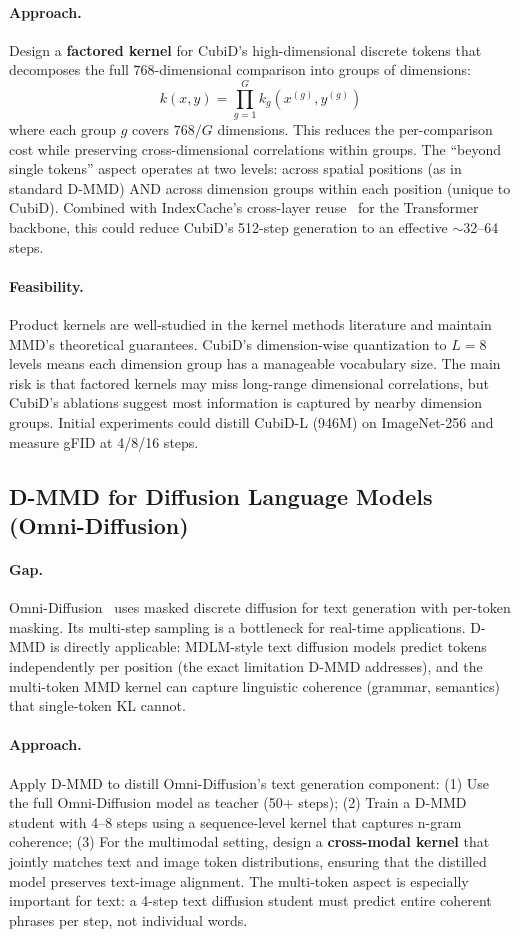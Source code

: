 \documentclass[11pt]{article}
\begin{document}
\paragraph{Approach.}
Design a \textbf{factored kernel} for CubiD's high-dimensional discrete tokens that decomposes the full $768$-dimensional comparison into groups of dimensions:
\[
k(x, y) = \prod_{g=1}^{G} k_g(x^{(g)}, y^{(g)})
\]
where each group $g$ covers $768/G$ dimensions.
This reduces the per-comparison cost while preserving cross-dimensional correlations within groups.
The ``beyond single tokens'' aspect operates at two levels: across spatial positions (as in standard D-MMD) AND across dimension groups within each position (unique to CubiD).
Combined with IndexCache's cross-layer reuse~\cite{indexcache} for the Transformer backbone, this could reduce CubiD's 512-step generation to an effective $\sim$32--64 steps.

\paragraph{Feasibility.}
Product kernels are well-studied in the kernel methods literature and maintain MMD's theoretical guarantees.
CubiD's dimension-wise quantization to $L=8$ levels means each dimension group has a manageable vocabulary size.
The main risk is that factored kernels may miss long-range dimensional correlations, but CubiD's ablations suggest most information is captured by nearby dimension groups.
Initial experiments could distill CubiD-L (946M) on ImageNet-256 and measure gFID at 4/8/16 steps.

\subsection{D-MMD for Diffusion Language Models (Omni-Diffusion)}

\paragraph{Gap.}
Omni-Diffusion~\cite{omnidiff} uses masked discrete diffusion for text generation with per-token masking.
Its multi-step sampling is a bottleneck for real-time applications.
D-MMD is directly applicable: MDLM-style text diffusion models predict tokens independently per position (the exact limitation D-MMD addresses), and the multi-token MMD kernel can capture linguistic coherence (grammar, semantics) that single-token KL cannot.

\paragraph{Approach.}
Apply D-MMD to distill Omni-Diffusion's text generation component:
(1) Use the full Omni-Diffusion model as teacher (50+ steps);
(2) Train a D-MMD student with 4--8 steps using a sequence-level kernel that captures n-gram coherence;
(3) For the multimodal setting, design a \textbf{cross-modal kernel} that jointly matches text and image token distributions, ensuring that the distilled model preserves text-image alignment.
The multi-token aspect is especially important for text: a 4-step text diffusion student must predict entire coherent phrases per step, not individual words.
\end{document}
